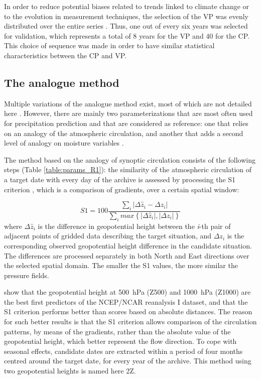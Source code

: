 \documentclass[review]{elsarticle}
\begin{document}
In order to reduce potential biases related to trends linked to climate change or to the evolution in measurement techniques, the selection of the VP was evenly distributed over the entire series \citep{BenDaoud2010}. Thus, one out of every six years was selected for validation, which represents a total of 8 years for the VP and 40 for the CP. This choice of sequence was made in order to have similar statistical characteristics between the CP and VP.


\subsection{The analogue method}
\label{sec:references}

Multiple variations of the analogue method exist, most of which are not detailed here \cite[see][for a more comprehensive listing]{BenDaoud2016}. However, there are mainly two parameterizations that are most often used for precipitation prediction and that are considered as reference: one that relies on an analogy of the atmospheric circulation, and another that adds a second level of analogy on moisture variables \citep{Obled2002, Bontron2005, Marty2012}.

The method based on the analogy of synoptic circulation consists of the following steps (Table \ref{table:params_R1}): the similarity of the atmospheric circulation of a target date with every day of the archive is assessed by processing the S1 criterion \citep[Eq.\ \ref{eq:S1}, ][]{Teweles1954, Drosdowsky2003}, which is a comparison of gradients, over a certain spatial window:

\begin{equation}
\label{eq:S1}
S1=100 \frac {\displaystyle \sum_{i} \vert \Delta\hat{z}_{i} - \Delta z_{i} \vert}
{\displaystyle \sum_{i} max\left\lbrace \vert \Delta\hat{z}_{i} \vert , \vert \Delta z_{i} \vert \right\rbrace }
\end{equation}
where $\Delta \hat{z}_{i}$ is the difference in geopotential height between the \textit{i}-th pair of adjacent points of gridded data describing the target situation, and $\Delta z_{i}$ is the corresponding observed geopotential height difference in the candidate situation. The differences are processed separately in both North and East directions over the selected spatial domain. The smaller the S1 values, the more similar the pressure fields.

\citet{Bontron2005} show that the geopotential height at 500~hPa (Z500) and 1000~hPa (Z1000) are the best first predictors of the NCEP/NCAR reanalysis I dataset, and that the S1 criterion performs better than scores based on absolute distances. The reason for such better results is that the S1 criterion allows comparison of the circulation patterns, by means of the gradients, rather than the absolute value of the geopotential height, which better represent the flow direction. To cope with seasonal effects, candidate dates are extracted within a period of four months centred around the target date, for every year of the archive. This method using two geopotential heights is named here 2Z.
\end{document}
